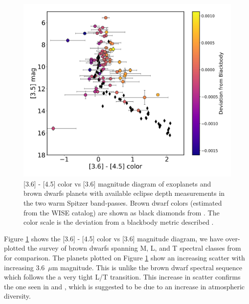 \begin{figure}
    \centering
    \includegraphics[width = \linewidth]{color+bd+emily.pdf}
    \caption{[3.6] - [4.5] color vs [3.6] magnitude diagram of exoplanets and brown dwarfs planets with available eclipse depth measurements in the two warm Spitzer band-passes. Brown dwarf colors (estimated from the WISE catalog) are shown as black diamonds from \citet{Dupuy2012}. The color scale is the deviation from a blackbody metric described \citet{Baxter2020}.}
    \label{P1:fig:colourmag}
\end{figure}

Figure \ref{P1:fig:colourmag} shows the [3.6] - [4.5] color vs [3.6] magnitude diagram, we have over-plotted the survey of brown dwarfs spanning M, L, and T spectral classes from \citet{Dupuy2012} for comparison. The planets plotted on Figure \ref{P1:fig:colourmag} show an increasing scatter with increasing 3.6~$\mu$m magnitude. This is unlike the brown dwarf spectral sequence which follows the a very tight L/T transition. This increase in scatter confirms the one seen in \citet{Triaud2014c, Beatty2014, Melville2020} and \citet{Dransfield2020}, which is suggested to be due to an increase in atmospheric diversity.

